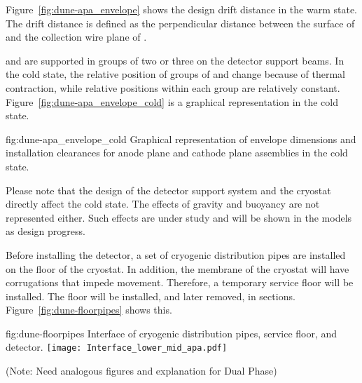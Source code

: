 Figure~\ref{fig:dune-apa_envelope} shows the design drift
distance in the warm state. The drift distance is defined as the
perpendicular distance between the surface of  and the collection
wire plane of .




 and  are supported in groups of
two or three on the detector support beams.  In the cold state, the
relative position of groups of  and  change because of thermal contraction, while relative positions
within each group are relatively
constant. Figure~\ref{fig:dune-apa_envelope_cold} is a graphical
representation in the cold state. 
\begin{dunefigure}{fig:dune-apa_envelope_cold} {Graphical
    representation of envelope dimensions and installation clearances
    for anode plane and cathode plane assemblies in the cold state.}
\end{dunefigure}


Please note that the design of the detector support system and
the cryostat directly affect the cold state. The
effects of gravity and buoyancy are not represented either. Such effects
are under study and will be shown in the models as design
progress.


Before installing the detector, a set of cryogenic distribution
pipes are installed on the floor of the cryostat. In addition, the
membrane of the cryostat will have corrugations that impede
movement. Therefore, a temporary service floor will be installed. The
floor will be installed, and later removed, in
sections. Figure~\ref{fig:dune-floorpipes} shows this.


\begin{dunefigure}{fig:dune-floorpipes} 
{Interface of cryogenic distribution pipes, service floor, and detector.}
  \texttt{[image: Interface\_lower\_mid\_apa.pdf]}
\end{dunefigure}




(Note: Need analogous figures and explanation for Dual Phase)




